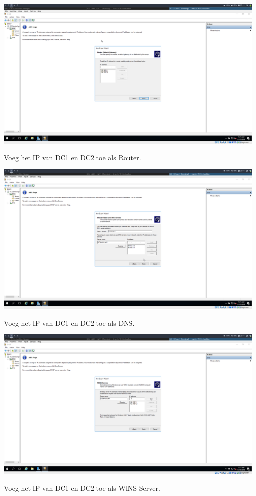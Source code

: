 \documentclass[a4paper]{article}
\begin{document}
\begin{center}
	\includegraphics[width=15cm]{Pictures/DC2/DHCP/1542309061.png}
	
	Voeg het IP van DC1 en DC2 toe als Router.
\end{center}
\begin{center}
	\includegraphics[width=15cm]{Pictures/DC2/DHCP/1542309102.png}
	
		Voeg het IP van DC1 en DC2 toe als DNS.
\end{center}
\begin{center}
	\includegraphics[width=15cm]{Pictures/DC2/DHCP/1542309120.png}
	
		Voeg het IP van DC1 en DC2 toe als WINS Server.
\end{center}
\end{document}

